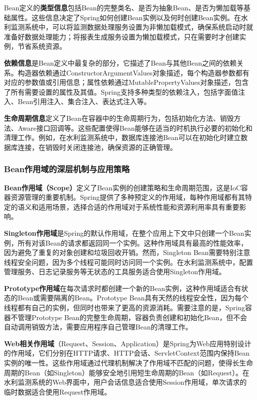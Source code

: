 Bean定义的\textbf{类型信息}包括Bean的完整类名、是否为抽象Bean、是否为懒加载等基础属性。这些信息决定了Spring如何创建Bean实例以及何时创建Bean实例。在水利监测系统中，可以将监测数据处理服务设置为非懒加载模式，确保系统启动时就准备好数据处理能力；将报表生成服务设置为懒加载模式，只在需要时才创建实例，节省系统资源。

\textbf{依赖信息}是Bean定义中最复杂的部分，它描述了Bean与其他Bean之间的依赖关系。构造器依赖通过ConstructorArgumentValues对象描述，每个构造器参数都有对应的参数值或引用信息；属性依赖通过MutablePropertyValues对象描述，包含了所有需要设置的属性及其值。Spring支持多种类型的依赖注入，包括字面值注入、Bean引用注入、集合注入、表达式注入等。

\textbf{生命周期信息}定义了Bean在容器中的生命周期行为，包括初始化方法、销毁方法、Aware接口回调等。这些配置使得Bean能够在适当的时机执行必要的初始化和清理工作。例如，在水利监测系统中，数据库连接池Bean可以在初始化时建立数据库连接，在销毁时关闭连接池，确保资源的正确管理。

\subsubsection{Bean作用域的深层机制与应用策略}\label{beanux4f5cux7528ux57dfux7684ux6df1ux5c42ux673aux5236ux4e0eux5e94ux7528ux7b56ux7565}

\textbf{Bean作用域（Scope）}定义了Bean实例的创建策略和生命周期范围，这是IoC容器资源管理的重要机制。Spring提供了多种预定义的作用域，每种作用域都有其特定的语义和适用场景，选择合适的作用域对于系统性能和资源利用率具有重要影响。

\textbf{Singleton作用域}是Spring的默认作用域，在整个应用上下文中只创建一个Bean实例，所有对该Bean的请求都返回同一个实例。这种作用域具有最高的性能效率，因为避免了重复的对象创建和垃圾回收开销。然而，Singleton Bean需要特别注意线程安全问题，因为多个线程可能同时访问同一个实例。在水利监测系统中，配置管理服务、日志记录服务等无状态的工具服务适合使用Singleton作用域。

\textbf{Prototype作用域}在每次请求时都创建一个新的Bean实例，这种作用域适合有状态的Bean或需要隔离的Bean。Prototype Bean具有天然的线程安全性，因为每个线程都有自己的实例，但同时也带来了更高的资源消耗。需要注意的是，Spring容器不管理Prototype Bean的完整生命周期，容器负责创建和初始化Bean，但不会自动调用销毁方法，需要应用程序自己管理Bean的清理工作。

\textbf{Web相关作用域}（Request、Session、Application）是Spring为Web应用特别设计的作用域，它们分别在HTTP请求、HTTP会话、ServletContext范围内保持Bean实例的唯一性。这些作用域通过代理机制解决了作用域不匹配的问题，使得长生命周期的Bean（如Singleton）能够安全地引用短生命周期的Bean（如Request）。在水利监测系统的Web界面中，用户会话信息适合使用Session作用域，单次请求的临时数据适合使用Request作用域。

